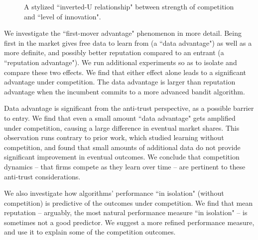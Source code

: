 \documentclass[acmsmall]{ec19acm}
\theoremstyle{definition}
\newcommand{\xhdr}[1]{\vspace{1mm} \noindent{\bf #1}}
\begin{document}
\begin{figure}[t]
\begin{center}
 \caption{A stylized ``inverted-U relationship" between strength of competition and ``level of innovation".}
\label{fig:inverted-U}
\end{center}
\end{figure}

\xhdr{Additional findings.}
We investigate the ``first-mover advantage" phenomenon in more detail. Being first in the market gives free data to learn from (a ``data advantage") as well as a more definite, and possibly better reputation compared to an entrant (a ``reputation advantage"). We run additional experiments so as to isolate and compare these two effects. We find that either effect alone leads to a significant advantage under competition. The data advantage is larger than reputation advantage when the incumbent commits to a more advanced bandit algorithm.

Data advantage is significant from the anti-trust perspective, as a possible barrier to entry. We find that even a small amount ``data advantage" gets amplified under competition, causing a large difference in eventual market shares. This observation runs contrary to prior work,  %
which studied learning without competition, and found that small amounts of additional data do not provide significant improvement in eventual outcomes. We conclude that competition dynamics -- that firms compete as they learn over time -- are pertinent to these anti-trust considerations.

We also investigate how algorithms' performance ``in isolation" (without competition) is predictive of the outcomes under competition. We find that mean reputation -- arguably, the most natural performance measure ``in isolation" -- is sometimes not a good predictor. We suggest a
more refined performance measure, and use it to explain some of the competition outcomes.
\end{document}
